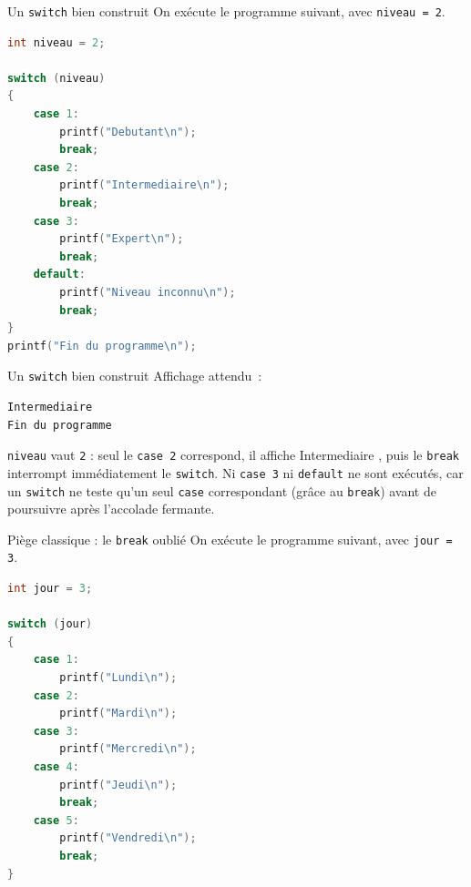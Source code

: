 
\begin{UPSTIexercice}{Un \texttt{switch} bien construit}
    On exécute le programme suivant, avec \texttt{niveau = 2}.
    \begin{lstlisting}[language=c]
int niveau = 2;

switch (niveau)
{
    case 1:
        printf("Debutant\n");
        break;
    case 2:
        printf("Intermediaire\n");
        break;
    case 3:
        printf("Expert\n");
        break;
    default:
        printf("Niveau inconnu\n");
        break;
}
printf("Fin du programme\n");
    \end{lstlisting}
\end{UPSTIexercice}

\begin{UPSTIprofOnlyEnv}
    \begin{UPSTIcorrectionP}{Un \texttt{switch} bien construit}
        Affichage attendu~:
        \begin{lstlisting}[language=bash,style=console]
Intermediaire
Fin du programme
        \end{lstlisting}
        \texttt{niveau} vaut \texttt{2} : seul le \texttt{case 2} correspond, il affiche \og Intermediaire \fg{}, puis le \texttt{break} interrompt immédiatement le \texttt{switch}. Ni \texttt{case 3} ni \texttt{default} ne sont exécutés, car un \texttt{switch} ne teste qu'un seul \texttt{case} correspondant (grâce au \texttt{break}) avant de poursuivre après l'accolade fermante.
    \end{UPSTIcorrectionP}
\end{UPSTIprofOnlyEnv}


\begin{UPSTIexercice}{Piège classique : le \texttt{break} oublié}
    On exécute le programme suivant, avec \texttt{jour = 3}.
    \begin{lstlisting}[language=c]
int jour = 3;

switch (jour)
{
    case 1:
        printf("Lundi\n");
    case 2:
        printf("Mardi\n");
    case 3:
        printf("Mercredi\n");
    case 4:
        printf("Jeudi\n");
        break;
    case 5:
        printf("Vendredi\n");
        break;
}
    \end{lstlisting}
\end{UPSTIexercice}

